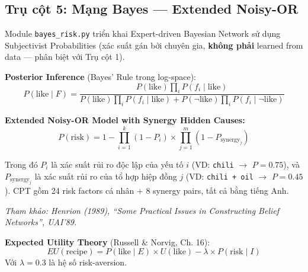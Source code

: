 \subsection{Trụ cột 5: Mạng Bayes --- Extended Noisy-OR}
\label{sec:bayes}

Module \texttt{bayes\_risk.py} triển khai Expert-driven Bayesian Network sử dụng Subjectivist Probabilities (xác suất gán bởi chuyên gia, \textbf{không phải} learned from data --- phân biệt với Trụ cột 1).

\textbf{Posterior Inference} (Bayes' Rule trong log-space):
\begin{equation}
P(\text{like} \mid F) = \frac{P(\text{like}) \prod_{i} P(f_i \mid \text{like})}{P(\text{like}) \prod_{i} P(f_i \mid \text{like}) + P(\neg\text{like}) \prod_{i} P(f_i \mid \neg\text{like})}
\end{equation}

\textbf{Extended Noisy-OR Model with Synergy Hidden Causes:}
\begin{equation}
P(\text{risk}) = 1 - \prod_{i=1}^{k} (1 - P_i) \times \prod_{j=1}^{m} (1 - P_{\text{synergy}_j})
\end{equation}

Trong đó $P_i$ là xác suất rủi ro độc lập của yếu tố $i$ (VD: \texttt{chili} $\to$ $P = 0.75$), và $P_{\text{synergy}_j}$ là xác suất rủi ro của tổ hợp hiệp đồng $j$ (VD: \texttt{chili + oil} $\to$ $P = 0.45$). CPT gồm 24 risk factors cá nhân + 8 synergy pairs, tất cả bằng tiếng Anh.

\textit{Tham khảo: Henrion (1989), ``Some Practical Issues in Constructing Belief Networks'', UAI'89.}

\textbf{Expected Utility Theory} (Russell \& Norvig, Ch. 16):
\begin{equation}
EU(\text{recipe}) = P(\text{like} \mid E) \times U(\text{like}) - \lambda \times P(\text{risk} \mid I)
\end{equation}
Với $\lambda = 0.3$ là hệ số risk-aversion.
